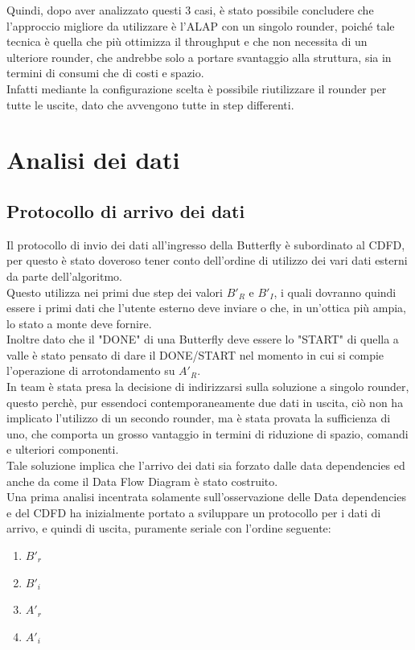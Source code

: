 \documentclass[a4paper, titlepage]{article}
\begin{document}
Quindi, dopo aver analizzato questi 3 casi, è stato possibile concludere che l'approccio migliore da utilizzare è l'ALAP con un singolo rounder, poiché tale tecnica è quella che più ottimizza il throughput e che non necessita di un ulteriore rounder, che andrebbe solo a portare svantaggio alla struttura, sia in termini di consumi che di costi e spazio.\\Infatti mediante la configurazione scelta è possibile riutilizzare il rounder per tutte le uscite, dato che avvengono tutte in step differenti.\\
\section{Analisi dei dati}
\subsection{Protocollo di arrivo dei dati}
Il protocollo di invio dei dati all'ingresso della Butterfly è subordinato al CDFD, per questo è stato doveroso tener conto dell'ordine di utilizzo dei vari dati esterni da parte dell'algoritmo.\\Questo utilizza nei primi due step dei valori $B'_R$ e $B'_I$, i quali dovranno quindi essere i primi dati che l'utente esterno deve inviare o che, in un'ottica più ampia, lo stato a monte deve fornire.\\Inoltre dato che il "DONE" di una Butterfly deve essere lo "START" di quella a valle è stato pensato di dare il DONE/START nel momento in cui si compie l'operazione di arrotondamento su $A'_R$.\\In team è stata presa la decisione di indirizzarsi sulla soluzione a singolo rounder, questo perchè, pur essendoci contemporaneamente due dati in uscita, ciò non ha implicato l’utilizzo di un secondo rounder, ma è stata provata la sufficienza di uno, che comporta un grosso vantaggio in termini di riduzione di spazio, comandi e ulteriori componenti.\\
Tale soluzione implica che l'arrivo dei dati sia forzato dalle data dependencies ed anche da come il Data Flow Diagram è stato costruito.\\
Una prima analisi incentrata solamente sull'osservazione delle Data dependencies e del CDFD ha inizialmente portato a sviluppare un protocollo per  i dati di arrivo, e quindi di uscita, puramente seriale con l'ordine seguente:
\begin{enumerate}
    \item $B'_r$
    \item $B'_i$
    \item $A'_r$
    \item $A'_i$
\end{enumerate}
    
\end{document}
